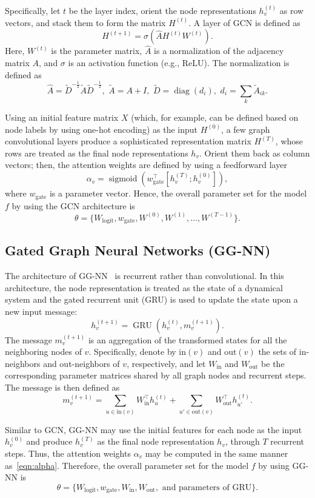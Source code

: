 \documentclass[letterpaper]{article} %
\DeclareMathOperator{\diag}{diag}
\DeclareMathOperator{\sigmoid}{sigmoid}
\DeclareMathOperator{\gru}{GRU}
\begin{document}
Specifically, let $t$ be the layer index, orient the node representations $h_v^{(t)}$ as row vectors, and stack them to form the matrix $H^{(t)}$. A layer of GCN is defined as
\[
H^{(t+1)}=\sigma(\widehat{A}H^{(t)}W^{(t)}).
\]
Here, $W^{(t)}$ is the parameter matrix, $\widehat{A}$ is a normalization of the adjacency matrix $A$, and $\sigma$ is an activation function (e.g., ReLU).
The normalization is defined as
\[
\widehat{A}=\widetilde{D}^{-\frac{1}{2}}\widetilde{A}\widetilde{D}^{-\frac{1}{2}},
\,\, \widetilde{A}=A+I,
\,\, \widetilde{D}=\diag(d_i),
\,\, d_i=\sum_k\widetilde{A}_{ik}.
\]

Using an initial feature matrix $X$ (which, for example, can be defined based on node labels by using one-hot encoding) as the input $H^{(0)}$, a few graph convolutional layers produce a sophisticated representation matrix $H^{(T)}$, whose rows are treated as the final node representations $h_v$. Orient them back as column vectors; then, the attention weights are defined by using a feedforward layer
\begin{equation}\label{eqn:alpha}
\alpha_v=\sigmoid(w_{\text{gate}}^{\top}[h_v^{(T)};h_v^{(0)}]),
\end{equation}
where $w_{\text{gate}}$ is a parameter vector. Hence, the overall parameter set for the model $f$ by using the GCN architecture is
\[
\theta=\{W_{\text{logit}}, w_{\text{gate}}, W^{(0)}, W^{(1)}, \ldots, W^{(T-1)}\}.
\]


\subsection{Gated Graph Neural Networks (GG-NN)}
The architecture of GG-NN~\cite{Li2016} is recurrent rather than convolutional. In this architecture, the node representation is treated as the state of a dynamical system and the gated recurrent unit (GRU) is used to update the state upon a new input message:
\[
h_v^{(t+1)}=\gru(h_v^{(t)},m_v^{(t+1)}).
\]
The message $m_v^{(t+1)}$ is an aggregation of the transformed states for all the neighboring nodes of $v$. Specifically, denote by $\text{in}(v)$ and $\text{out}(v)$ the sets of in-neighbors and out-neighbors of $v$, respectively, and let $W_{\text{in}}$ and $W_{\text{out}}$ be the corresponding parameter matrices shared by all graph nodes and recurrent steps. The message is then defined as
\[
m_v^{(t+1)}=\sum_{u\in \text{in}(v)}W_{\text{in}}^{\top}h_u^{(t)}
+\sum_{u'\in \text{out}(v)}W_{\text{out}}^{\top}h_{u'}^{(t)}.
\]

Similar to GCN, GG-NN may use the initial features for each node as the input $h_v^{(0)}$ and produce $h_v^{(T)}$ as the final node representation $h_v$, through $T$ recurrent steps. Thus, the attention weights $\alpha_v$ may be computed in the same manner as~\eqref{eqn:alpha}. Therefore, the overall parameter set for the model $f$ by using GG-NN is
\[
\theta=\{W_{\text{logit}}, w_{\text{gate}}, W_{\text{in}}, W_{\text{out}}, \text{ and parameters of GRU}\}.
\]
\end{document}
